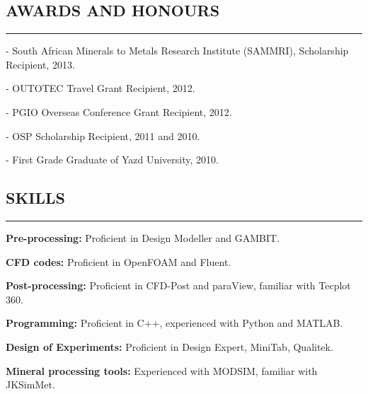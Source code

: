 \documentclass[10pt,a4]{article}
\begin{document}
\begin{small}
\subsection*{AWARDS AND HONOURS}
\hrule
\vspace{0.2cm}
\begin{list}{}{}
	\item - South African Minerals to Metals Research Institute (SAMMRI), Scholarship Recipient, 2013.
	\item - OUTOTEC Travel Grant Recipient, 2012.
	\item - PGIO Overseas Conference Grant Recipient, 2012.
	\item - OSP Scholarship Recipient, 2011 and 2010.
	\item - First Grade Graduate of Yazd University, 2010.
\end{list}


\subsection*{SKILLS}
\hrule
\vspace{0.2cm}
\begin{list}{}{}
	\item \textbf{Pre-processing:} Proficient in Design Modeller and GAMBIT.
	\item \textbf{CFD codes:} Proficient in OpenFOAM and Fluent.
	\item \textbf{Post-processing:} Proficient in CFD-Post and paraView, familiar with Tecplot 360.	
	\item \textbf{Programming:} Proficient in C++, experienced with Python and MATLAB.
    \item \textbf{Design of Experiments:} Proficient in Design Expert, MiniTab, Qualitek.
    \item \textbf{Mineral processing tools:} Experienced with MODSIM, familiar with JKSimMet.
\end{list}




\end{small}
\end{document}
